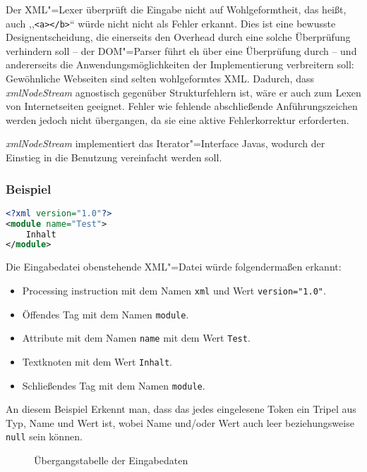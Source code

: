 \documentclass[10pt,a4paper,ngerman,titlepage,tocindentauto]{scrartcl}
\begin{document}
			Der XML"=Lexer überprüft die Eingabe nicht auf Wohlgeformtheit, das heißt, auch
			,,\verb|<a></b>|`` würde nicht nicht als Fehler erkannt. Dies ist eine bewusste Designentscheidung,
			die einerseits den Overhead durch eine solche Überprüfung verhindern soll – der DOM"=Parser
			führt eh über eine Überprüfung durch – und andererseits die Anwendungsmöglichkeiten der Implementierung
			verbreitern soll: Gewöhnliche Webseiten sind selten wohlgeformtes XML. Dadurch,
			dass {\em xmlNodeStream} agnostisch gegenüber Strukturfehlern ist, wäre er auch zum
			Lexen von Internetseiten geeignet. Fehler wie fehlende abschließende Anführungszeichen werden
			jedoch nicht übergangen, da sie eine aktive Fehlerkorrektur erforderten.
			
			{\em xmlNodeStream} implementiert das Iterator"=Interface Javas, wodurch der Einstieg in die
			Benutzung vereinfacht werden soll.
			
			\subsubsection*{Beispiel}
				\begin{lstlisting}[frame=single,language=XML,caption=Beispiel.xml]
<?xml version="1.0"?>
<module name="Test">
	Inhalt
</module>
				\end{lstlisting}
				Die Eingabedatei obenstehende XML"=Datei würde folgendermaßen erkannt:
				\begin{itemize}
					\item Processing instruction mit dem Namen \verb|xml| und Wert \verb|version="1.0"|.
					\item Öffendes Tag mit dem Namen \verb|module|.
					\item Attribute mit dem Namen \verb|name| mit dem Wert \verb|Test|.
					\item Textknoten mit dem Wert \verb|Inhalt|.
					\item Schließendes Tag mit dem Namen \verb|module|.
				\end{itemize}
				An diesem Beispiel Erkennt man, dass das jedes eingelesene Token ein Tripel aus
				Typ, Name und Wert ist, wobei Name und/oder Wert auch leer beziehungsweise \texttt{null} sein können.
			
			\begin{figure}[ht]
				\caption[Übergangstabelle der Eingabedaten]{\hypertarget{Uebergangsdiagramm_XML_Lexer}{Übergangstabelle der Eingabedaten}}
			\end{figure}
			
\end{document}

